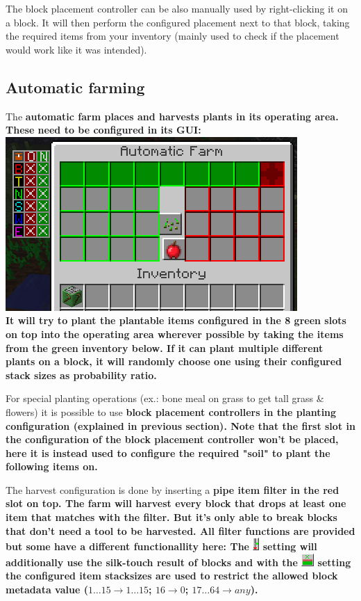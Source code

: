 \documentclass[11pt]{article} %
\begin{document}
The block placement controller can be also manually used by right-clicking it on a block. It will then perform the configured placement next to that block, taking the required items from your inventory (mainly used to check if the placement would work like it was intended).

\subsection{Automatic farming}
The \bf automatic farm \rm places and harvests plants in its operating area. These need to be configured in its GUI:\\
\includegraphics[width = \textwidth]{farm} \\
It will try to plant the plantable items configured in the 8 green slots on top into the operating area wherever possible by taking the items from the green inventory below. If it can plant multiple different plants on a block, it will randomly choose one using their configured stack sizes as probability ratio. 

For special planting operations (ex.: bone meal on grass to get tall grass \& flowers) it is possible to use \bf block placement controllers \rm in the planting configuration (explained in previous section). Note that the first slot in the configuration of the block placement controller won't be placed, here it is instead used to configure the required "soil" to plant the following items on.

The harvest configuration is done by inserting a \bf pipe item filter \rm in the red slot on top. The farm will harvest every block that drops at least one item that matches with the filter. But it's only able to break blocks that don't need a tool to be harvested. All filter functions are provided but some have a different functionallity here: The \includegraphics[align = c]{sendFurtherN} setting will additionally use the silk-touch result of blocks and with the \includegraphics[align = c]{itemLimitY} setting the configured item stacksizes are used to restrict the allowed block metadata value ($1 \dots 15 \rightarrow 1 \dots 15$; $16 \rightarrow 0$; $17 \dots 64 \rightarrow any$).
\end{document}
